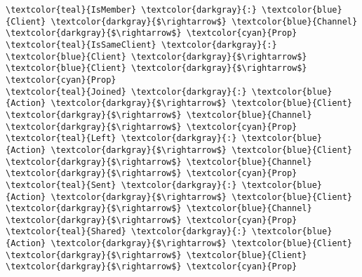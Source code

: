 \begin{Verbatim}[commandchars=\\\{\},codes={\catcode`$=3}]
\textcolor{teal}{IsMember} \textcolor{darkgray}{:} \textcolor{blue}{Client} \textcolor{darkgray}{$\rightarrow$} \textcolor{blue}{Channel} \textcolor{darkgray}{$\rightarrow$} \textcolor{cyan}{Prop}
\textcolor{teal}{IsSameClient} \textcolor{darkgray}{:} \textcolor{blue}{Client} \textcolor{darkgray}{$\rightarrow$} \textcolor{blue}{Client} \textcolor{darkgray}{$\rightarrow$} \textcolor{cyan}{Prop}
\textcolor{teal}{Joined} \textcolor{darkgray}{:} \textcolor{blue}{Action} \textcolor{darkgray}{$\rightarrow$} \textcolor{blue}{Client} \textcolor{darkgray}{$\rightarrow$} \textcolor{blue}{Channel} \textcolor{darkgray}{$\rightarrow$} \textcolor{cyan}{Prop}
\textcolor{teal}{Left} \textcolor{darkgray}{:} \textcolor{blue}{Action} \textcolor{darkgray}{$\rightarrow$} \textcolor{blue}{Client} \textcolor{darkgray}{$\rightarrow$} \textcolor{blue}{Channel} \textcolor{darkgray}{$\rightarrow$} \textcolor{cyan}{Prop}
\textcolor{teal}{Sent} \textcolor{darkgray}{:} \textcolor{blue}{Action} \textcolor{darkgray}{$\rightarrow$} \textcolor{blue}{Client} \textcolor{darkgray}{$\rightarrow$} \textcolor{blue}{Channel} \textcolor{darkgray}{$\rightarrow$} \textcolor{cyan}{Prop}
\textcolor{teal}{Shared} \textcolor{darkgray}{:} \textcolor{blue}{Action} \textcolor{darkgray}{$\rightarrow$} \textcolor{blue}{Client} \textcolor{darkgray}{$\rightarrow$} \textcolor{blue}{Client} \textcolor{darkgray}{$\rightarrow$} \textcolor{cyan}{Prop}


\end{Verbatim}

